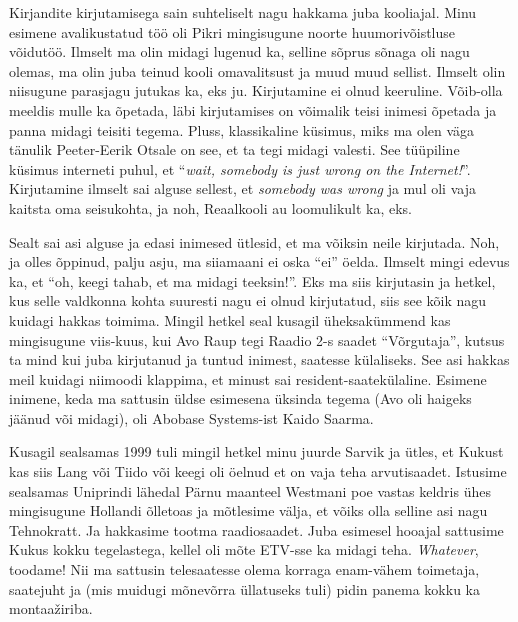 
Kirjandite kirjutamisega sain suhteliselt nagu hakkama juba kooliajal. Minu 
esimene avalikustatud töö oli Pikri mingisugune noorte 
huumorivõistluse võidutöö. Ilmselt ma olin midagi lugenud ka,  selline sõprus 
sõnaga oli nagu olemas, ma olin juba teinud  kooli omavalitsust ja muud muud 
sellist. Ilmselt olin niisugune parasjagu jutukas ka, eks ju. Kirjutamine ei 
olnud keeruline. Võib-olla meeldis mulle ka õpetada,  läbi kirjutamises on 
võimalik teisi inimesi õpetada ja panna midagi teisiti tegema. Pluss, 
klassikaline küsimus, miks ma olen väga tänulik Peeter-Eerik Otsale on see, et 
ta tegi midagi valesti. See tüüpiline küsimus interneti puhul, et 
\enquote{\emph{wait, somebody is just wrong on the Internet!}}. Kirjutamine 
ilmselt sai alguse sellest, et \emph{somebody was wrong} ja mul oli vaja 
kaitsta oma  seisukohta, ja noh, Reaalkooli au loomulikult ka, eks. 

Sealt sai asi alguse ja edasi inimesed ütlesid, et ma võiksin neile kirjutada. 
Noh, ja  olles õppinud, palju asju, ma siiamaani ei oska \enquote{ei} öelda. 
Ilmselt mingi edevus ka, et \enquote{oh, keegi tahab, et ma midagi teeksin!}. 
Eks ma siis kirjutasin ja hetkel, kus selle valdkonna kohta suuresti nagu ei 
olnud kirjutatud, siis see kõik nagu kuidagi hakkas toimima. Mingil hetkel seal 
kusagil üheksakümmend kas mingisugune viis-kuus, kui Avo Raup tegi Raadio 2-s saadet \enquote{Võrgutaja}, kutsus ta mind kui juba 
kirjutanud ja tuntud inimest, saatesse külaliseks. See asi hakkas meil kuidagi 
niimoodi klappima, et minust sai resident-saatekülaline. Esimene inimene, keda 
ma sattusin üldse esimesena üksinda tegema  (Avo oli haigeks jäänud või 
midagi), oli Abobase Systems-ist Kaido 
Saarma. 

Kusagil sealsamas 1999 tuli mingil hetkel minu juurde 
Sarvik ja ütles, et Kukust kas siis Lang või Tiido või 
keegi oli öelnud et on vaja teha arvutisaadet. Istusime sealsamas Uniprindi 
lähedal Pärnu maanteel Westmani poe vastas keldris ühes mingisugune Hollandi 
õlletoas ja mõtlesime välja, et võiks olla selline asi nagu Tehnokratt. Ja 
hakkasime tootma raadiosaadet. Juba esimesel hooajal sattusime Kukus kokku 
tegelastega, kellel oli mõte ETV-sse ka midagi teha. \emph{Whatever}, toodame! Nii ma sattusin 
telesaatesse olema korraga enam-vähem toimetaja, saatejuht ja (mis muidugi 
mõnevõrra üllatuseks tuli) pidin panema kokku ka montaažiriba.

